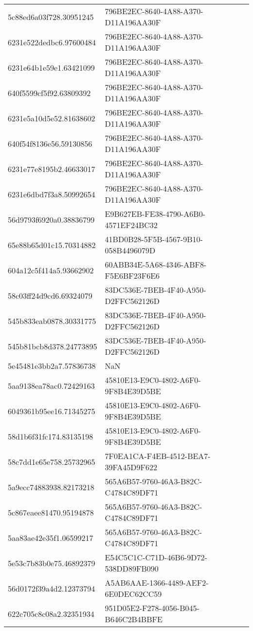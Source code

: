 \begin{tabular}{ll}
5c88ed6a03f728.30951245 & 796BE2EC-8640-4A88-A370-D11A196AA30F \\
6231e522dedbc6.97600484 & 796BE2EC-8640-4A88-A370-D11A196AA30F \\
6231e64b1e59e1.63421099 & 796BE2EC-8640-4A88-A370-D11A196AA30F \\
640f5599cf5f92.63809392 & 796BE2EC-8640-4A88-A370-D11A196AA30F \\
6231e5a10d5e52.81638602 & 796BE2EC-8640-4A88-A370-D11A196AA30F \\
640f54f8136e56.59130856 & 796BE2EC-8640-4A88-A370-D11A196AA30F \\
6231e77e8195b2.46633017 & 796BE2EC-8640-4A88-A370-D11A196AA30F \\
6231e6dbd7f3a8.50992654 & 796BE2EC-8640-4A88-A370-D11A196AA30F \\
56d9793f6920a0.38836799 & E9B627EB-FE38-4790-A6B0-4571EF24BC32 \\
65e88b65d01c15.70314882 & 41BD0B28-5F5B-4567-9B10-058B4496079D \\
604a12c5f414a5.93662902 & 60ABB34E-5A68-4346-ABF8-F5E6BF23F6E6 \\
58c03ff24d9cd6.69324079 & 83DC536E-7BEB-4F40-A950-D2FFC562126D \\
545b833eab0878.30331775 & 83DC536E-7BEB-4F40-A950-D2FFC562126D \\
545b81bcb8d378.24773895 & 83DC536E-7BEB-4F40-A950-D2FFC562126D \\
5e45481e3bb2a7.57836738 & NaN \\
5aa9138ea78ac0.72429163 & 45810E13-E9C0-4802-A6F0-9F8B4E39D5BE \\
6049361b95ee16.71345275 & 45810E13-E9C0-4802-A6F0-9F8B4E39D5BE \\
58d1b6f31fc174.83135198 & 45810E13-E9C0-4802-A6F0-9F8B4E39D5BE \\
58c7dd1e65e758.25732965 & 7F0EA1CA-F4EB-4512-BEA7-39FA45D9F622 \\
5a9ecc74883938.82173218 & 565A6B57-9760-46A3-B82C-C4784C89DF71 \\
5c867eaee81470.95194878 & 565A6B57-9760-46A3-B82C-C4784C89DF71 \\
5aa83ae42e35f1.06599217 & 565A6B57-9760-46A3-B82C-C4784C89DF71 \\
5e53c7b83b0e75.46892379 & E54C5C1C-C71D-46B6-9D72-538DD89FB090 \\
56d0172f39a4d2.12373794 & A5AB6AAE-1366-4489-AEF2-6E0DEC62CC59 \\
622c705c8c08a2.32351934 & 951D05E2-F278-4056-B045-B646C2B4BBFE \\

\end{tabular}
